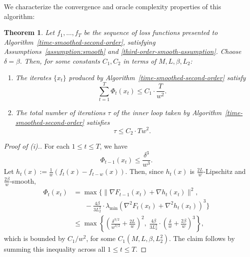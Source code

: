 \documentclass{article}
\def\norm#1{\mathopen\| #1 \mathclose\|}
\newcommand{\braces}[1]{\left\{#1\right\}}
\newcommand{\pa}[1]{\left(#1\right)}
\newtheorem{theorem}{Theorem}[section]
\newcommand{\Lmin}{\lambda_{\mathrm{min}}}
\begin{document}
We characterize the convergence and oracle complexity properties of this algorithm:
\begin{theorem}
Let $f_1, \ldots, f_T$ be the sequence of loss functions presented to Algorithm~\ref{time-smoothed-second-order}, satisfying Assumptions~\ref{assumption:smooth} and \ref{third-order-smooth-assumption}. Choose $\delta = \beta$. Then, for some constants $C_1, C_2$ in terms of $M, L, \beta, L_2$:
\begin{enumerate}
\item[(i)] The iterates $\{x_t\}$ produced by Algorithm~\ref{time-smoothed-second-order} satisfy
\[\sum_{t=1}^T \Phi_t(x_t) \leq C_1 \cdot \frac{T}{w^2}.\]
\item[(ii)] The total number of iterations $\tau$ of the inner loop taken by Algorithm~\ref{time-smoothed-second-order} satisfies
\[\tau \leq C_2 \cdot Tw^2.\]
\end{enumerate}
\end{theorem}
\begin{proof}[Proof of (i).]
For each $1 \leq t \leq T$, we have
\[\Phi_{t-1}(x_t) \leq \frac{\delta^3}{w^3}.\]
Let $h_t(x) := \frac{1}{w} \pa{ f_t(x) - f_{t-w}(x) }$.
Then, since $h_t(x)$ is $\frac{2L}{w}$-Lipschitz and $\frac{2\beta}{w}$-smooth,
\begin{align*}
\Phi_t(x_t) &= \max\Big\{ \norm{\nabla F_{t-1}(x_t) + \nabla h_t(x_t)}^2, \\
& \;\;\;\;\;\; -\frac{4\beta}{3L_2^2} \cdot \Lmin(\nabla^2 F_{t}(x_t) + \nabla^2 h_t(x_t))^3 \Big\} \\
&\leq \max\braces{\pa{\frac{\delta^{3/2}}{w^{3/2}} + \frac{2L}{w} }^2, \; \frac{4\beta}{3L_2^2} \cdot \pa{ \frac{\delta}{w} + \frac{2\beta}{w} }^3},
\end{align*}
which is bounded by $C_1/w^2$, for some $C_1(M, L, \beta, L_2^2)$. The claim follows by summing this inequality across all $1 \leq t \leq T$.
\end{proof}
\end{document}
